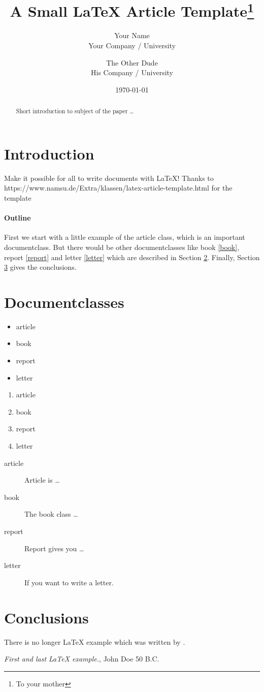 \documentclass{article}
\title{A Small \LaTeX{} Article Template\thanks{To your mother}}
\author{Your Name  \\
	Your Company / University  \\
	\and 
	The Other Dude \\
	His Company / University \\
	}
\date{\today}
\begin{document}
\maketitle


\begin{abstract}
Short introduction to subject of the paper \ldots 
\end{abstract}

\section{Introduction}
Make it possible for all to write documents with \LaTeX{}!
Thanks to https://www.namsu.de/Extra/klassen/latex-article-template.html
for the template

\paragraph{Outline}
First we start with a little example of the article class, which is an 
important documentclass. But there would be other documentclasses like 
book \ref{book}, report \ref{report} and letter \ref{letter} which are 
described in Section \ref{documentclasses}. Finally, Section 
\ref{conclusions} gives the conclusions.



\section{Documentclasses} \label{documentclasses}

\begin{itemize}
\item article
\item book 
\item report 
\item letter 
\end{itemize}


\begin{enumerate}
\item article
\item book 
\item report 
\item letter 
\end{enumerate}

\begin{description}
\item[article\label{article}]{Article is \ldots}
\item[book\label{book}]{The book class \ldots}
\item[report\label{report}]{Report gives you \ldots}
\item[letter\label{letter}]{If you want to write a letter.}
\end{description}


\section{Conclusions}\label{conclusions}
There is no longer \LaTeX{} example which was written by \cite{doe}.


\begin{thebibliography}{9}
 \emph{First and last \LaTeX{} example.},
John Doe 50 B.C. 
\end{thebibliography}
\end{document}

